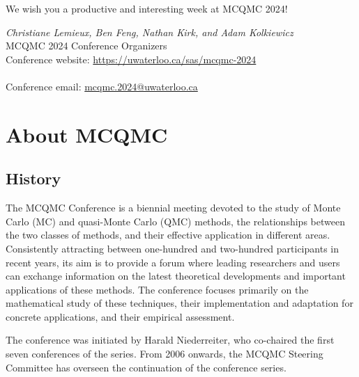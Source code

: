 We wish you a productive and interesting week at MCQMC 2024!


\bigskip
\emph{Christiane Lemieux, Ben Feng, Nathan Kirk, and Adam Kolkiewicz} \\
MCQMC 2024 Conference Organizers \\




\vspace{5cm}
Conference website: \url{https://uwaterloo.ca/sas/mcqmc-2024} \\
\\
Conference email: \url{mcqmc.2024@uwaterloo.ca}

\thispagestyle{empty} \tableofcontents

\section{About MCQMC}

\subsection{History}

The MCQMC Conference is a biennial meeting devoted to the study of Monte
Carlo (MC) and quasi-Monte Carlo (QMC) methods, the relationships between
the two classes of methods, and their effective application in different
areas. Consistently attracting between one-hundred and two-hundred participants in recent years, its aim
is to provide a forum where leading researchers and users can exchange
information on the latest theoretical developments and important
applications of these methods. The conference focuses primarily
on the mathematical study of these techniques, their implementation and
adaptation for concrete applications, and their empirical assessment.

The conference was initiated by Harald Niederreiter, who co-chaired the
first seven conferences of the series. From 2006 onwards, the MCQMC Steering Committee has
overseen the continuation of the conference series.


